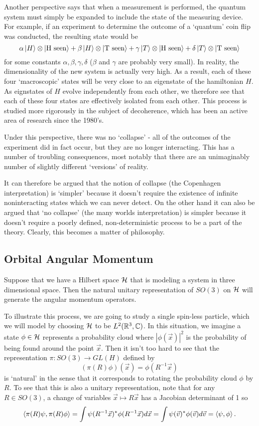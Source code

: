 \documentclass[a4paper]{article}
\begin{document}
Another perspective says that when a measurement is performed, the quantum system must simply be expanded to include the state of the measuring device. For example, if an experiment to determine the outcome of a `quantum' coin flip was conducted, the resulting state would be $$\alpha \left\lvert H \right\rangle\otimes\left\lvert \text{H seen} \right\rangle + \beta \left\lvert H \right\rangle\otimes\left\lvert \text{T seen} \right\rangle + \gamma \left\lvert T \right\rangle\otimes\left\lvert \text{H seen} \right\rangle + \delta \left\lvert T \right\rangle\otimes\left\lvert \text{T seen} \right\rangle$$ for some constants $\alpha, \beta, \gamma, \delta$ ($\beta$ and $\gamma$ are probably very small). In reality, the dimensionality of the new system is actually very high. As a result, each of these four `macroscopic' states will be very close to an eigenstate of the hamiltonian $H$. As eignstates of $H$ evolve independently from each other, we therefore see that each of these four states are effectively isolated from each other. This process is studied more rigorously in the subject of decoherence, which has been an active area of research since the 1980's.

Under this perspective, there was no `collapse' - all of the outcomes of the experiment did in fact occur, but they are no longer interacting. This has a number of troubling consequences, most notably that there are an unimaginably number of slightly different `versions' of reality. 

It can therefore be argued that the notion of collapse (the Copenhagen interpretation) is `simpler' because it doesn't require the existence of infinite noninteracting states which we can never detect. On the other hand it can also be argued that `no collapse' (the many worlds interpretation) is simpler because it doesn't require a poorly defined, non-deterministic process to be a part of the theory. Clearly, this becomes a matter of philosophy.

\subsection{Orbital Angular Momentum}
Suppose that we have a Hilbert space $\mathcal{H}$ that is modeling a system in three dimensional space. Then the natural unitary representation of $SO(3)$ on $\mathcal{H}$ will generate the angular momentum operators. 

To illustrate this process, we are going to study a single spin-less particle, which we will model by choosing $\mathcal{H}$ to be $L^2(\mathbb{R}^3, \mathbb{C})$. In this situation, we imagine a state $\phi \in \mathcal{H}$ represents a probability cloud where $|\phi(\vec{x})|^2$ is the probability of being found around the point $\vec{x}$. Then it isn't too hard to see that the representation $\pi : SO(3) \to GL(H)$ defined by
$$(\pi(R)\phi)(\vec{x}) = \phi(R^{-1}\vec{x})$$
is `natural' in the sense that it corresponds to rotating the probability cloud $\phi$ by $R$. To see that this is also a unitary representation, note that for any $R \in SO(3)$, a change of variables $\vec{x} \mapsto R\vec{x}$ has a Jacobian determinant of 1 so 
$$\left\langle \pi(R)\psi , \pi(R)\phi \right\rangle = \int \psi(R^{-1}\vec{x})^* \phi(R^{-1}\vec{x})d\vec{x} = \int \psi(\vec{v})^* \phi(\vec{v})d\vec{v} = \left\langle \psi , \phi \right\rangle.$$
\end{document}
